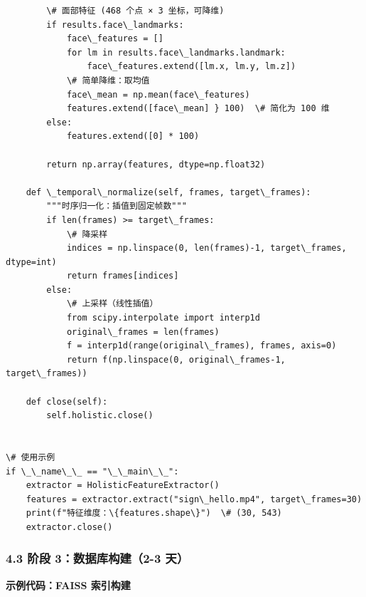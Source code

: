 \documentclass[a4paper,12pt]{article}
\begin{document}
\begin{verbatim}
        \# 面部特征 (468 个点 × 3 坐标，可降维)
        if results.face\_landmarks:
            face\_features = []
            for lm in results.face\_landmarks.landmark:
                face\_features.extend([lm.x, lm.y, lm.z])
            \# 简单降维：取均值
            face\_mean = np.mean(face\_features)
            features.extend([face\_mean] } 100)  \# 简化为 100 维
        else:
            features.extend([0] * 100)
        
        return np.array(features, dtype=np.float32)
    
    def \_temporal\_normalize(self, frames, target\_frames):
        """时序归一化：插值到固定帧数"""
        if len(frames) >= target\_frames:
            \# 降采样
            indices = np.linspace(0, len(frames)-1, target\_frames, dtype=int)
            return frames[indices]
        else:
            \# 上采样（线性插值）
            from scipy.interpolate import interp1d
            original\_frames = len(frames)
            f = interp1d(range(original\_frames), frames, axis=0)
            return f(np.linspace(0, original\_frames-1, target\_frames))
    
    def close(self):
        self.holistic.close()


\# 使用示例
if \_\_name\_\_ == "\_\_main\_\_":
    extractor = HolisticFeatureExtractor()
    features = extractor.extract("sign\_hello.mp4", target\_frames=30)
    print(f"特征维度：\{features.shape\}")  \# (30, 543)
    extractor.close()
\end{verbatim}


\subsubsection{4.3 阶段 3：数据库构建（2-3 天）}

\textbf{示例代码：FAISS 索引构建}
\end{document}
